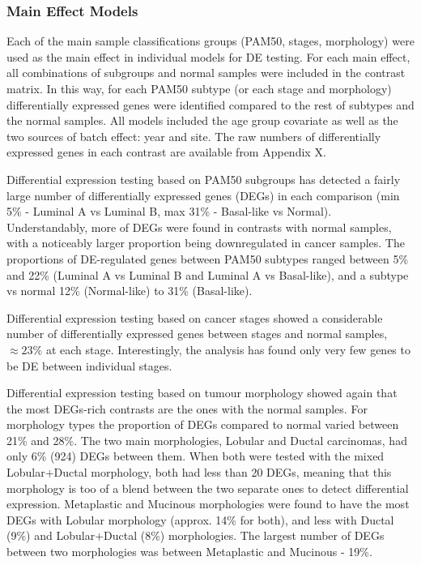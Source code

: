        \subsubsection{Main Effect Models}
        
        Each of the main sample classifications groups (PAM50, stages, morphology) were used as the main effect in individual models for DE testing. For each main effect, all combinations of subgroups and normal samples were included in the contrast matrix. In this way, for each PAM50 subtype (or each stage and morphology) differentially expressed genes were identified compared to the rest of subtypes and the normal samples. All models included the age group covariate as well as the two sources of batch effect: year and site. The raw numbers of differentially expressed genes in each contrast are available from Appendix X.

        Differential expression testing based on PAM50 subgroups has detected a fairly large number of differentially expressed genes (DEGs) in each comparison (min 5\% - Luminal A vs Luminal B, max 31\% - Basal-like vs Normal). Understandably, more of DEGs were found in contrasts with normal samples, with a noticeably larger proportion being downregulated in cancer samples. The proportions of DE-regulated genes between PAM50 subtypes ranged between 5\% and 22\% (Luminal A vs Luminal B and Luminal A vs Basal-like), and a subtype vs normal 12\% (Normal-like) to 31\% (Basal-like). 
        
        Differential expression testing based on cancer stages showed a considerable number of differentially expressed genes between stages and normal samples, $\approx 23\%$ at each stage. Interestingly, the analysis has found only very few genes to be DE between individual stages.
        
        Differential expression testing based on tumour morphology showed again that the most DEGs-rich contrasts are the ones with the normal samples. For morphology types the proportion of DEGs compared to normal varied between 21\% and 28\%. The two main morphologies, Lobular and Ductal carcinomas,  had only 6\% (924) DEGs between them. When both were tested with the mixed Lobular+Ductal morphology, both had less than 20 DEGs, meaning that this morphology is too of a blend between the two separate ones to detect differential expression. Metaplastic and Mucinous morphologies were found to have the most DEGs with Lobular morphology (approx. 14\% for both), and less with Ductal (9\%) and Lobular+Ductal (8\%) morphologies. The largest number of DEGs between two morphologies was between Metaplastic and Mucinous - 19\%. 
        
